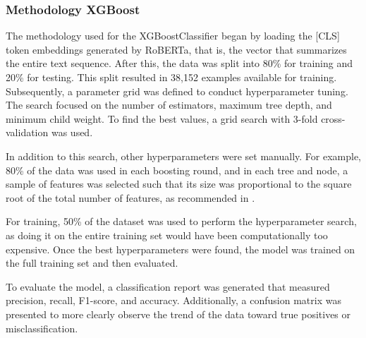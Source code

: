 \subsubsection{Methodology XGBoost}

The methodology used for the XGBoostClassifier began by loading the [CLS] token embeddings generated by RoBERTa, that is, the vector that summarizes the entire text sequence. After this, the data was split into 80\% for training and 20\% for testing. This split resulted in 38,152 examples available for training. Subsequently, a parameter grid was defined to conduct hyperparameter tuning. The search focused on the number of estimators, maximum tree depth, and minimum child weight. To find the best values, a grid search with 3-fold cross-validation was used.

In addition to this search, other hyperparameters were set manually. For example, 80\% of the data was used in each boosting round, and in each tree and node, a sample of features was selected such that its size was proportional to the square root of the total number of features, as recommended in \cite{fieri2023offensive}.

For training, 50\% of the dataset was used to perform the hyperparameter search, as doing it on the entire training set would have been computationally too expensive. Once the best hyperparameters were found, the model was trained on the full training set and then evaluated.

To evaluate the model, a classification report was generated that measured precision, recall, F1-score, and accuracy. Additionally, a confusion matrix was presented to more clearly observe the trend of the data toward true positives or misclassification.
